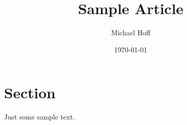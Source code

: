 \documentclass[a4paper]{article}
\title{Sample Article}
\author{Michael Hoff}
\date{\today}
\begin{document}
\maketitle

\section{Section}

Just some sample text.
\end{document}
